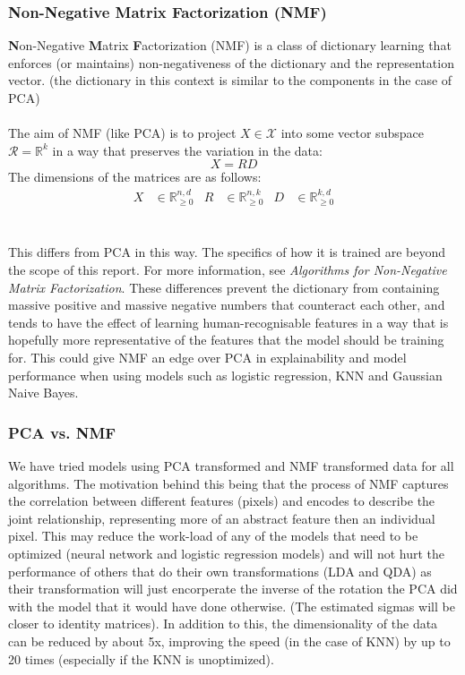 \documentclass{article}
\begin{document}
\begin{multicols}{2}
\subsubsection{Non-Negative Matrix Factorization (NMF)}
\textbf Non-Negative \textbf Matrix \textbf Factorization (NMF) is a class of dictionary learning that enforces (or maintains) non-negativeness of the dictionary and the representation vector. (the dictionary in this context is similar to the components in the case of PCA)
\\
\\
The aim of NMF (like PCA) is to project $X \in \mathcal X$ into some vector subspace $\mathcal R = \mathbb R^k$ in a way that preserves the variation in the data:
\begin{equation}
X = RD
\end{equation}
The dimensions of the matrices are as follows:
\begin{align*}
    X &\in \mathbb R_{\ge 0}^{n, d}
    &
    R &\in \mathbb R_{\ge 0}^{n, k}
    &
    D &\in \mathbb R_{\ge 0}^{k, d}
\end{align*}
\\\\
This differs from PCA in this way. The specifics of how it is trained are beyond the scope of this report. For more information, see \emph{Algorithms for Non-Negative Matrix Factorization}\cite{NMF}. These differences prevent the dictionary from containing massive positive and massive negative numbers that counteract each other, and tends to have the effect of learning human-recognisable features in a way that is hopefully more representative of the features that the model should be training for. This could give NMF an edge over PCA in explainability and model performance when using models such as logistic regression, KNN and Gaussian Naive Bayes.

\subsubsection{PCA vs. NMF}
We have tried models using PCA transformed and NMF transformed data for all algorithms. The motivation behind this being that the process of NMF captures the correlation between different features (pixels) and encodes to describe the joint relationship, representing more of an abstract feature then an individual pixel. This may reduce the work-load of any of the models that need to be optimized (neural network and logistic regression models) and will not hurt the performance of others that do their own transformations (LDA and QDA) as their transformation will just encorperate the inverse of the rotation the PCA did with the model that it would have done otherwise. (The estimated sigmas will be closer to identity matrices). In addition to this, the dimensionality of the data can be reduced by about 5x, improving the speed (in the case of KNN) by up to 20 times (especially if the KNN is unoptimized).


\end{multicols}
\end{document}
